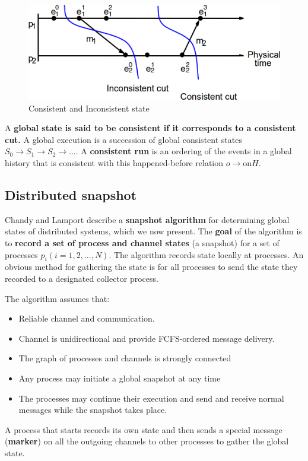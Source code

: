 \begin{figure}[!h]
    \centering
    \includegraphics[width=.60\linewidth]{images/Clock/consistentState.png}
    \caption{Consistent and Inconsistent state}
\end{figure}

A \textbf{global state is said to be consistent if it corresponds to a consistent cut.} A global execution is a succession of global consistent states \(S_0 \rightarrow S_1 \rightarrow S_2 \rightarrow ....\) A \textbf{consistent run} is an ordering of the events in a global history that is consistent with this happened-before relation \(o \rightarrow \textrm{on} H\).

\subsection{Distributed snapshot}
Chandy and Lamport describe a \textbf{snapshot algorithm} for determining global states of distributed systems, which we now present. The \textbf{goal} of the algorithm is to \textbf{record a set of process and channel states} (a snapshot) for a set of processes \(p_i (i = 1, 2, ..., N)\).  The algorithm records state locally at processes. An obvious method for gathering the state is for all processes to send the state they recorded to a designated collector process.

The algorithm assumes that:
\begin{itemize}
    \item Reliable channel and communication.
    \item Channel is unidirectional and provide FCFS-ordered message delivery.
    \item The graph of processes and channels is strongly connected
    \item Any process may initiate a global snapshot at any time
    \item The processes may continue their execution and send and receive normal messages while the snapshot takes place.
\end{itemize}
A process that starts records its own state and then sends a special message (\textbf{marker}) on all the outgoing channels to other processes to gather the global state. 